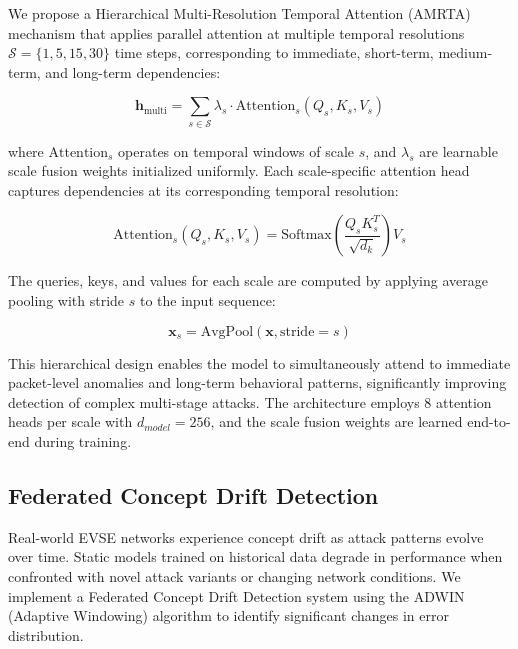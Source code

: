 We propose a Hierarchical Multi-Resolution Temporal Attention (AMRTA) mechanism that applies parallel attention at multiple temporal resolutions $\mathcal{S} = \{1, 5, 15, 30\}$ time steps, corresponding to immediate, short-term, medium-term, and long-term dependencies:

\begin{equation}
	\label{equation:multi-resolution-attention}
	\mathbf{h}_{\text{multi}} = \sum_{s \in \mathcal{S}} \lambda_s \cdot \text{Attention}_s(Q_s, K_s, V_s)
\end{equation}

where $\text{Attention}_s$ operates on temporal windows of scale $s$, and $\lambda_s$ are learnable scale fusion weights initialized uniformly. Each scale-specific attention head captures dependencies at its corresponding temporal resolution:

\begin{equation}
	\label{equation:scale-specific-attention}
	\text{Attention}_s(Q_s, K_s, V_s) = \text{Softmax}\left(\frac{Q_s K_s^T}{\sqrt{d_k}}\right) V_s
\end{equation}

The queries, keys, and values for each scale are computed by applying average pooling with stride $s$ to the input sequence:

\begin{equation}
	\label{equation:scale-pooling}
	\mathbf{x}_s = \text{AvgPool}(\mathbf{x}, \text{stride}=s)
\end{equation}

This hierarchical design enables the model to simultaneously attend to immediate packet-level anomalies and long-term behavioral patterns, significantly improving detection of complex multi-stage attacks. The architecture employs 8 attention heads per scale with $d_{model} = 256$, and the scale fusion weights are learned end-to-end during training.

\subsection{Federated Concept Drift Detection}
\label{subsection:concept-drift-detection}
Real-world EVSE networks experience concept drift as attack patterns evolve over time. Static models trained on historical data degrade in performance when confronted with novel attack variants or changing network conditions. We implement a Federated Concept Drift Detection system using the ADWIN (Adaptive Windowing) algorithm to identify significant changes in error distribution. \\

